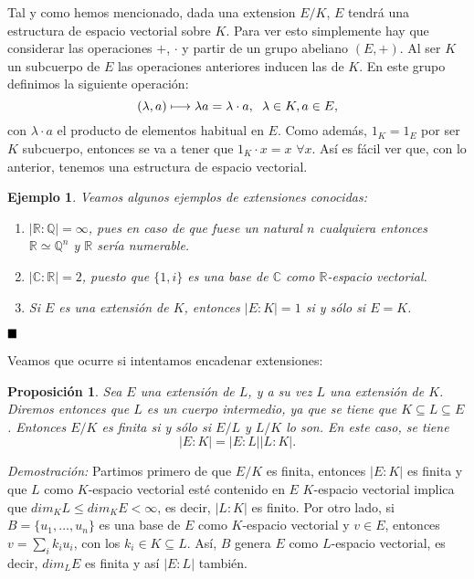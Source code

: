 \documentclass[12pt]{article}
\newtheorem{proposition}[theorem]{Proposición}
\newtheorem{example}{Ejemplo}[theorem]
\begin{document}
Tal y como hemos mencionado, dada una extension $E/K$, $E$ tendrá una estructura de espacio vectorial sobre $K$. Para ver esto simplemente hay que considerar las operaciones $+$, $\cdot$ y partir de un grupo abeliano $(E, +)$. Al ser $K$ un subcuerpo de $E$ las operaciones anteriores inducen las de $K$. En este grupo definimos la siguiente operación: $$(\lambda, a) \longmapsto \lambda a = \lambda \cdot a, \hspace{0.2cm} \lambda \in K, a \in E,$$ con $\lambda \cdot a$ el producto de elementos habitual en $E$. Como además, $1_{K} = 1_{E}$ por ser $K$ subcuerpo, entonces se va a tener que $1_{K} \cdot x = x$ $\forall x$. Así es fácil ver que, con lo anterior, tenemos una estructura de espacio vectorial.

\begin{example} Veamos algunos ejemplos de extensiones conocidas: \begin{enumerate}
\item $|\mathbb{R} : \mathbb{Q}| = \infty$, pues en caso de que fuese un natural $n$ cualquiera entonces $\mathbb{R} \simeq \mathbb{Q}^{n}$ y $\mathbb{R}$ sería numerable.
\item $|\mathbb{C} : \mathbb{R} | = 2$, puesto que $\lbrace 1, i \rbrace$ es una base de $\mathbb{C}$ como $\mathbb{R}$-espacio vectorial.
\item Si $E$ es una extensión de $K$, entonces $|E : K | = 1$ si y sólo si $E = K$.
\end{enumerate}
\end{example}

$\hfill \blacksquare$

Veamos que ocurre si intentamos encadenar extensiones:
\begin{proposition} \label{eq:trgr} Sea $E$ una extensión de $L$, y a su vez $L$ una extensión de $K$. Diremos entonces que $L$ es un cuerpo intermedio, ya que se tiene que $K \subseteq L \subseteq E$. Entonces $E/K$ es finita si y sólo si $E/L$ y $L/K$ lo son. En este caso, se tiene $$|E: K| = |E:L| |L:K|.$$
\end{proposition}
\emph{Demostración: } Partimos primero de que $E/K$ es finita, entonces $|E:K|$ es finita y que $L$ como $K$-espacio vectorial esté contenido en $E$ $K$-espacio vectorial implica que $dim_{K} L \leq dim_{K} E < \infty$, es decir, $|L:K|$ es finito. Por otro lado, si $B = \lbrace u_{1}, \ldots, u_{n}\rbrace$ es una base de $E$ como $K$-espacio vectorial y $v \in E$, entonces $v = \sum_{i} k_{i}u_{i}$, con los $k_{i} \in K \subseteq L$. Así, $B$ genera $E$ como $L$-espacio vectorial, es decir, $dim_{L}E$ es finita y así $|E:L|$ también.
\end{document}
